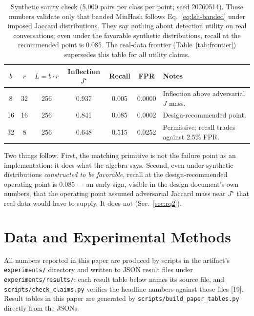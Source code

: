 \documentclass[11pt]{article}
\begin{document}
\renewcommand{\arraystretch}{1.25}
\begin{table}[!htbp]
\centering
\footnotesize
\begin{tabularx}{0.92\textwidth}{@{}c c c c c c X@{}}
\toprule
$b$ & $r$ & $L = b{\cdot}r$ & Inflection $J^\star$ & Recall & FPR & Notes \\
\midrule
8  & 32 & 256 & 0.937 & 0.005  & 0.0000 & Inflection above adversarial $J$ mass. \\
16 & 16 & 256 & 0.841 & 0.085  & 0.0002 & Design-recommended point. \\
32 & 8  & 256 & 0.648 & 0.515  & 0.0252 & Permissive; recall trades against 2.5\% FPR. \\
\bottomrule
\end{tabularx}
\caption{Synthetic sanity check (5{,}000 pairs per class per point; seed 20260514). These numbers validate only that banded MinHash follows Eq.~\eqref{eq:lsh-banded} under imposed Jaccard distributions. They say nothing about detection utility on real conversations; even under the favorable synthetic distributions, recall at the recommended point is 0.085. The real-data frontier (Table~\ref{tab:frontier}) supersedes this table for all utility claims.}
\label{tab:scurve}
\end{table}

Two things follow. First, the matching primitive is not the failure point as an implementation: it does what the algebra says. Second, even under synthetic distributions \emph{constructed to be favorable}, recall at the design-recommended operating point is 0.085 --- an early sign, visible in the design document's own numbers, that the operating point assumed adversarial Jaccard mass near $J^\star$ that real data would have to supply. It does not (Sec.~\ref{sec:rq2}).

\section{Data and Experimental Methods}
\label{sec:methods}

All numbers reported in this paper are produced by scripts in the artifact's \texttt{experiments/} directory and written to JSON result files under \texttt{experiments/results/}; each result table below names its source file, and \texttt{scripts/check\_claims.py} verifies the headline numbers against those files [19]. Result tables in this paper are generated by \texttt{scripts/build\_paper\_tables.py} directly from the JSONs.
\end{document}
